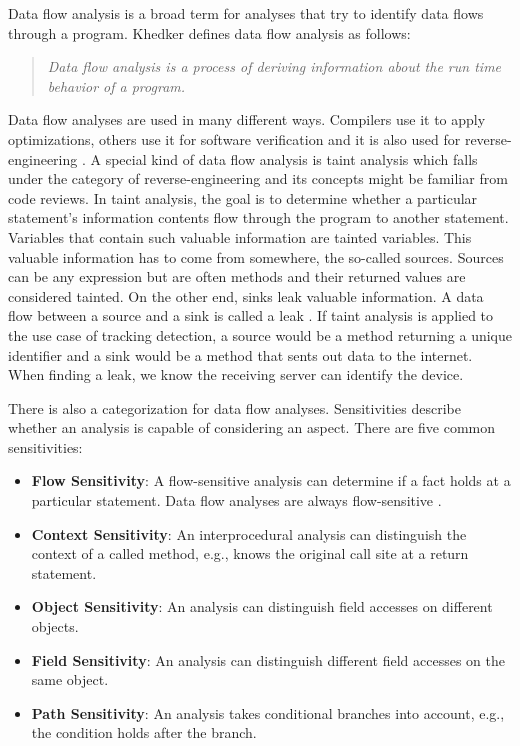 \documentclass[../draft.tex]{subfiles}
\begin{document}
    Data flow analysis is a broad term for analyses that try to identify data flows through a program. Khedker \cite{Khedker2009} defines data flow analysis as follows:
    \begin{quote}
        \textit{Data flow analysis is a process of deriving information about the run time behavior of a program.}
    \end{quote}
    Data flow analyses are used in many different ways. Compilers use it to apply optimizations, others use it for software verification and it is also used for reverse-engineering \cite{Khedker2009}. A special kind of data flow analysis is taint analysis which falls under the category of reverse-engineering and its concepts might be familiar from code reviews. In taint analysis, the goal is to determine whether a particular statement's information contents flow through the program to another statement. Variables that contain such valuable information are tainted variables. This valuable information has to come from somewhere, the so-called sources. Sources can be any expression but are often methods and their returned values are considered tainted. On the other end, sinks leak valuable information. A data flow between a source and a sink is called a leak \cite{Arzt2017PhD}. If taint analysis is applied to the use case of tracking detection, a source would be a method returning a unique identifier and a sink would be a method that sents out data to the internet. When finding a leak, we know the receiving server can identify the device.

    There is also a categorization for data flow analyses. Sensitivities describe whether an analysis is capable of considering an aspect. There are five common sensitivities: 
    \begin{itemize}
        \item \textbf{Flow Sensitivity}: A flow-sensitive analysis can determine if a fact holds at a particular statement. Data flow analyses are always flow-sensitive \cite{Khedker2009}.
        \item \textbf{Context Sensitivity}: An interprocedural analysis can distinguish the context of a called method, e.g., knows the original call site at a return statement.
        \item \textbf{Object Sensitivity}: An analysis can distinguish field accesses on different objects.
        \item \textbf{Field Sensitivity}: An analysis can distinguish different field accesses on the same object.
        \item \textbf{Path Sensitivity}: An analysis takes conditional branches into account, e.g., the condition holds after the branch.
    \end{itemize}
\end{document}
